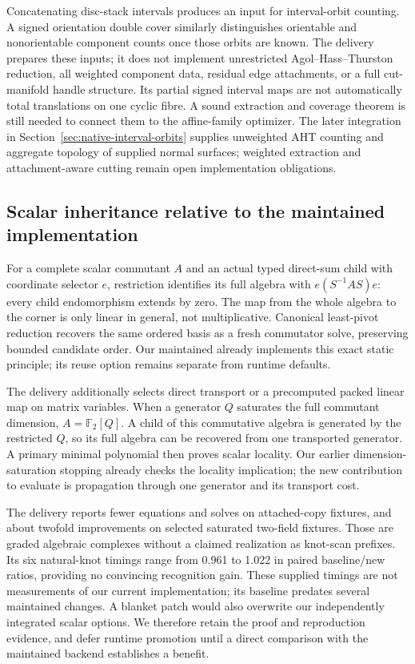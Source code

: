 Concatenating disc-stack intervals produces an input for interval-orbit
counting. A signed orientation double cover similarly distinguishes
orientable and nonorientable component counts once those orbits are known.
The delivery prepares these inputs; it does not implement unrestricted
Agol--Hass--Thurston reduction, all weighted component data, residual edge
attachments, or a full cut-manifold handle structure. Its partial signed
interval maps are not automatically total translations on one cyclic fibre.
A sound extraction and coverage theorem is still needed to connect them
to the affine-family optimizer.
The later integration in Section~\ref{sec:native-interval-orbits} supplies
unweighted AHT counting and aggregate topology of supplied normal surfaces;
weighted extraction and attachment-aware cutting remain open implementation
obligations.

\subsection{Scalar inheritance relative to the maintained implementation}

For a complete scalar commutant $A$ and an actual typed direct-sum child
with coordinate selector $e$, restriction identifies its full algebra with
$e(S^{-1}AS)e$: every child endomorphism extends by zero. The map from the
whole algebra to the corner is only linear in general, not multiplicative.
Canonical least-pivot reduction recovers the same ordered basis as a fresh
commutator solve, preserving bounded candidate order. Our maintained
 already implements this exact static principle;
its reuse option remains separate from runtime defaults.

The delivery additionally selects direct transport or a precomputed packed
linear map on matrix variables. When a generator $Q$ saturates the full
commutant dimension, $A=\mathbb F_2[Q]$. A child of this commutative algebra
is generated by the restricted $Q$, so its full algebra can be recovered
from one transported generator. A primary minimal polynomial then proves
scalar locality. Our earlier dimension-saturation stopping already checks
the locality implication; the new contribution to evaluate is propagation
through one generator and its transport cost.

The delivery reports fewer equations and solves on attached-copy fixtures,
and about twofold improvements on selected saturated two-field fixtures.
Those are graded algebraic complexes without a claimed realization as
knot-scan prefixes. Its six natural-knot timings range from 0.961 to 1.022
in paired baseline/new ratios, providing no convincing recognition gain.
These supplied timings are not measurements of our current implementation;
its baseline predates several maintained changes. A blanket patch would
also overwrite our independently integrated scalar options. We therefore
retain the proof and reproduction evidence, and defer runtime promotion
until a direct comparison with the maintained backend establishes a benefit.

